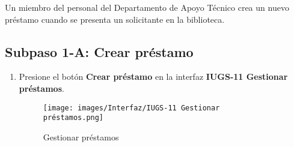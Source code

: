 Un miembro del personal del Departamento de Apoyo Técnico crea un nuevo préstamo cuando se presenta un solicitante en la biblioteca.

\subsection{Subpaso 1-A: Crear préstamo}
\begin{enumerate}
	\item Presione el botón \textbf{Crear préstamo} en la interfaz
    \textbf{IUGS-11 Gestionar préstamos}.
    \begin{figure}[hbtp]
	\texttt{[image: images/Interfaz/IUGS-11 Gestionar préstamos.png]}
	\caption{Gestionar préstamos}
	\end{figure}
\end{enumerate}